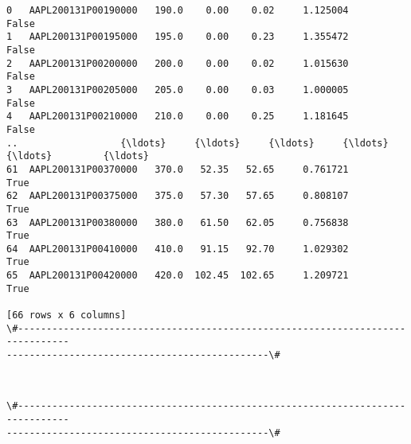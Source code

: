 \documentclass[paper=landscape]{scrartcl}
\begin{document}
\begin{Verbatim}[commandchars=\\\{\}]
0   AAPL200131P00190000   190.0    0.00    0.02     1.125004       False
1   AAPL200131P00195000   195.0    0.00    0.23     1.355472       False
2   AAPL200131P00200000   200.0    0.00    0.02     1.015630       False
3   AAPL200131P00205000   205.0    0.00    0.03     1.000005       False
4   AAPL200131P00210000   210.0    0.00    0.25     1.181645       False
..                  {\ldots}     {\ldots}     {\ldots}     {\ldots}          {\ldots}         {\ldots}
61  AAPL200131P00370000   370.0   52.35   52.65     0.761721        True
62  AAPL200131P00375000   375.0   57.30   57.65     0.808107        True
63  AAPL200131P00380000   380.0   61.50   62.05     0.756838        True
64  AAPL200131P00410000   410.0   91.15   92.70     1.029302        True
65  AAPL200131P00420000   420.0  102.45  102.65     1.209721        True

[66 rows x 6 columns]
\#-------------------------------------------------------------------------------
----------------------------------------------\#
    \end{Verbatim}

    \begin{center}
    \end{center}
    { \hspace*{\fill} \\}
    
    \begin{Verbatim}[commandchars=\\\{\}]
\#-------------------------------------------------------------------------------
----------------------------------------------\#
    \end{Verbatim}

    \begin{center}
    \end{center}
    { \hspace*{\fill} \\}
    

    
    
    
\end{document}
